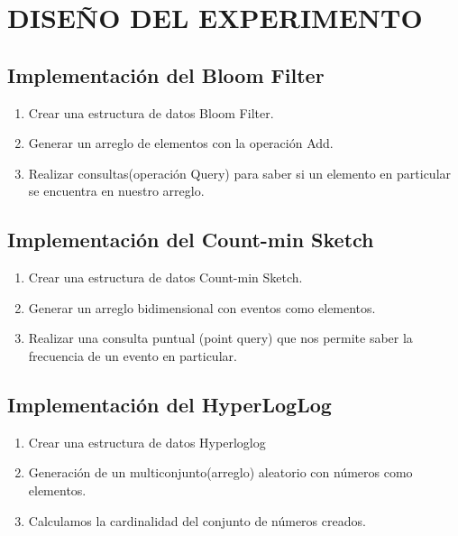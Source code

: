 \documentclass[journal]{IEEEtran}
\begin{document}
\section{DISE\~NO DEL EXPERIMENTO}

\subsection{Implementaci\'on del Bloom Filter}

    \begin{enumerate}
	    \item
            Crear una estructura de datos Bloom Filter.
	    \item
	    Generar un arreglo de elementos con la operaci\'on Add.
	    \item
	    Realizar consultas(operaci\'on Query) para saber si un elemento en particular se encuentra en nuestro arreglo.
        \end{enumerate}

\subsection{Implementaci\'on del Count-min Sketch}

    \begin{enumerate}
	    \item
            Crear una estructura de datos Count-min Sketch.
	    \item
	    Generar un arreglo bidimensional con eventos como elementos.
	    \item
	    Realizar una consulta puntual (point query) que nos permite saber la frecuencia de un evento en particular.
	    
        \end{enumerate}

\subsection{Implementaci\'on del HyperLogLog}

     \begin{enumerate}
        \item
            Crear una estructura de datos Hyperloglog
	    \item
	    Generaci\'on de un multiconjunto(arreglo) aleatorio con n\'umeros como elementos. 
	    \item
	    Calculamos la cardinalidad del conjunto de n\'umeros creados.
        \end{enumerate}
\end{document}
